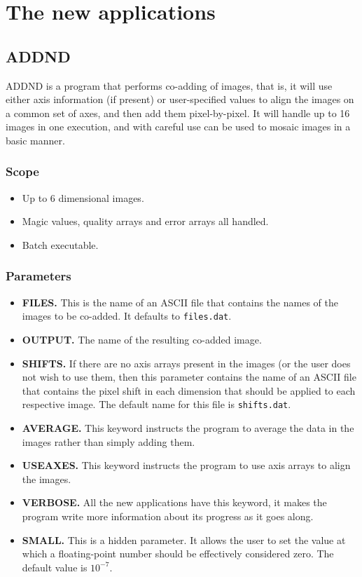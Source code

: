 \section{The new applications{}}
\label{sec:new}

\subsection{ADDND}

ADDND is a program that performs co-adding of images, that is, it will use
either axis information (if present) or user-specified values to align the
images on a common set of axes, and then add them pixel-by-pixel. It will
handle up to 16 images in one execution, and with careful use can be used to
mosaic images in a basic manner.

\subsubsection{Scope}

\begin{itemize}
\item Up to 6 dimensional images.
\item Magic values, quality arrays and error arrays all handled.
\item Batch executable.
\end{itemize}

\subsubsection{Parameters}

\begin{itemize}
\item {\bf FILES.} This is the name of an ASCII file that contains the names of
the images to be co-added. It defaults to {\tt files.dat}.
\item {\bf OUTPUT.} The name of the resulting co-added image.
\item {\bf SHIFTS.} If there are no axis arrays present in the images (or the
user does not wish to use them, then this parameter contains the name of an
ASCII file that contains the pixel shift in each dimension that should be
applied to each respective image. The default name for this file is {\tt shifts.dat}.
\item {\bf AVERAGE.} This keyword instructs the program to average the data in
the images rather than simply adding them.
\item {\bf USEAXES.} This keyword instructs the program to use axis arrays to
align the images.
\item {\bf VERBOSE.} All the new applications have this keyword, it makes the
program write more information about its progress as it goes along.
\item {\bf SMALL.} This is a hidden parameter. It allows the user to set the
value at which a floating-point number should be effectively considered zero.
The default value is $10^{-7}$.
\end{itemize}

